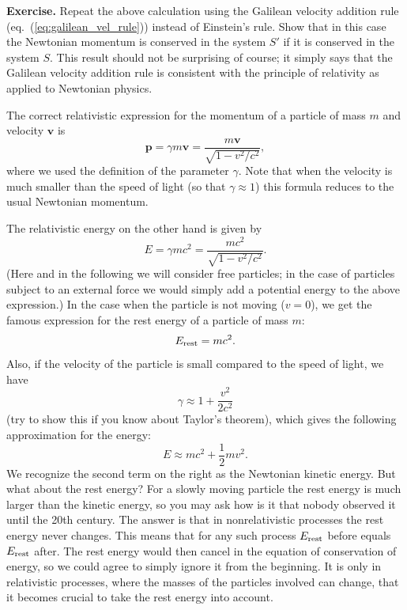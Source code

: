 {\bf Exercise.} Repeat the above calculation using the Galilean velocity addition rule (eq.\ (\ref{eq:galilean_vel_rule})) instead of Einstein's rule. Show that in this case the Newtonian momentum is conserved in the system $S'$ if it is conserved in the system $S$. This result should not be surprising of course; it simply says that the Galilean velocity addition rule is consistent with the principle of relativity as applied to Newtonian physics.

\par\vspace{\baselineskip}

The correct relativistic expression for the momentum of a particle of mass $m$ and velocity $\mathbf{v}$ is
\begin{equation} \label{eq:rel_momentum}
\mathbf{p}=\gamma m\mathbf{v}=\frac{m\mathbf{v}}{\sqrt{1-v^2/c^2}},
\end{equation}
where we used the definition of the parameter $\gamma$. Note that when the velocity is much smaller than the speed of light (so that $\gamma\approx1$) this formula reduces to the usual Newtonian momentum.

The relativistic energy on the other hand is given by
\begin{equation} \label{eq:rel_energy}
E=\gamma mc^2=\frac{mc^2}{\sqrt{1-v^2/c^2}}.
\end{equation}
(Here and in the following we will consider free particles; in the case of particles subject to an external force we would simply add a potential energy to the above expression.) In the case when the particle is not moving ($v=0$), we get the famous expression for the rest energy of a particle of mass $m$:
\begin{equation}
E_{\rm rest}=mc^2.
\end{equation}
Also, if the velocity of the particle is small compared to the speed of light, we have
\begin{equation}
\gamma\approx 1+\frac{v^2}{2c^2}
\end{equation}
(try to show this if you know about Taylor's theorem), which gives the following approximation for the energy:
\begin{equation}
E\approx mc^2+\frac{1}{2}mv^2.
\end{equation}
We recognize the second term on the right as the Newtonian kinetic energy. But what about the rest energy? For a slowly moving particle the rest energy is much larger than the kinetic energy, so you may ask how is it that nobody observed it until the 20th century. The answer is that in nonrelativistic processes the rest energy never changes. This means that for any such process $E_{\rm rest}$ before equals $E_{\rm rest}$ after. The rest energy would then cancel in the equation of conservation of energy, so we could agree to simply ignore it from the beginning. It is only in relativistic processes, where the masses of the particles involved can change, that it becomes crucial to take the rest energy into account.

